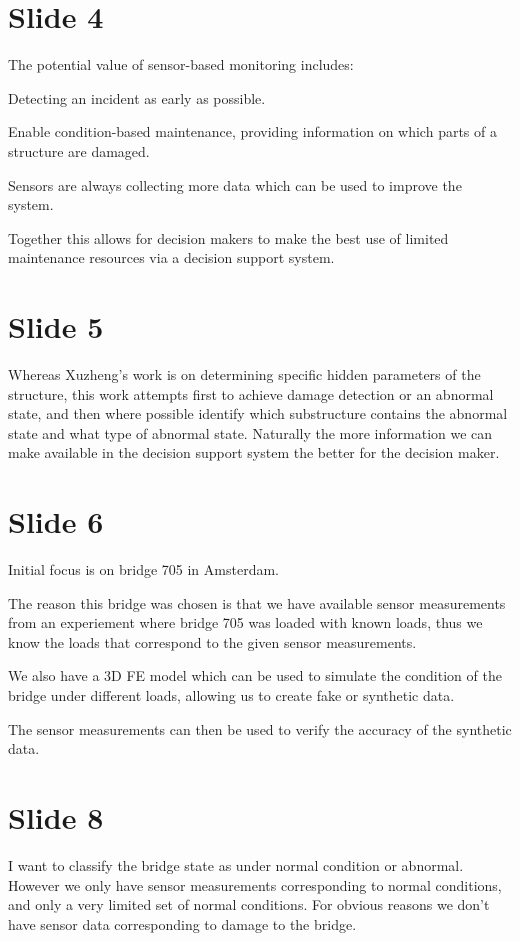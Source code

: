 \documentclass[11pt]{article}
\begin{document}
\section{Slide 4}
\label{sec:org87e978a}
The potential value of sensor-based monitoring includes:

Detecting an incident as early as possible.

Enable condition-based maintenance, providing information on which parts of a
structure are damaged.

Sensors are always collecting more data which can be used to improve the
system.

Together this allows for decision makers to make the best use of limited
maintenance resources via a decision support system. 
\section{Slide 5}
\label{sec:org9bc313c}
Whereas Xuzheng's work is on determining specific hidden parameters of the
structure, this work attempts first to achieve damage detection or an abnormal
state, and then where possible identify which substructure contains the
abnormal state and what type of abnormal state. Naturally the more information
we can make available in the decision support system the better for the
decision maker.
\section{Slide 6}
\label{sec:org96159a6}
Initial focus is on bridge 705 in Amsterdam.

The reason this bridge was chosen is that we have available sensor
measurements from an experiement where bridge 705 was loaded with known loads,
thus we know the loads that correspond to the given sensor measurements.

We also have a 3D FE model which can be used to simulate the condition of the
bridge under different loads, allowing us to create fake or synthetic data.

The sensor measurements can then be used to verify the accuracy of the
synthetic data.
\section{Slide 8}
\label{sec:org4d3b0c1}
I want to classify the bridge state as under normal condition or abnormal.
However we only have sensor measurements corresponding to normal conditions,
and only a very limited set of normal conditions. For obvious reasons we don't
have sensor data corresponding to damage to the bridge.
\end{document}
